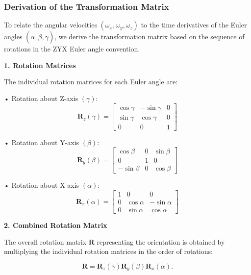 \documentclass[12pt]{article}
\begin{document}
\subsubsection{Derivation of the Transformation Matrix}

To relate the angular velocities \((\omega_x, \omega_y, \omega_z)\) to the time derivatives of the Euler angles \((\dot{\alpha}, \dot{\beta}, \dot{\gamma})\), we derive the transformation matrix based on the sequence of rotations in the ZYX Euler angle convention.

\vspace{0.5cm}

\textbf{1. Rotation Matrices}

The individual rotation matrices for each Euler angle are:

• Rotation about Z-axis \((\gamma)\):
\begin{equation}
\label{eq:R_z}
\mathbf{R}_z(\gamma) =
\begin{bmatrix}
\cos\gamma & -\sin\gamma & 0 \\
\sin\gamma & \cos\gamma & 0 \\
0 & 0 & 1
\end{bmatrix}
\end{equation}

• Rotation about Y-axis \((\beta)\):
\begin{equation}
\label{eq:R_y}
\mathbf{R}_y(\beta) =
\begin{bmatrix}
\cos\beta & 0 & \sin\beta \\
0 & 1 & 0 \\
-\sin\beta & 0 & \cos\beta
\end{bmatrix}
\end{equation}

• Rotation about X-axis \((\alpha)\):
\begin{equation}
\label{eq:R_x}
\mathbf{R}_x(\alpha) =
\begin{bmatrix}
1 & 0 & 0 \\
0 & \cos\alpha & -\sin\alpha \\
0 & \sin\alpha & \cos\alpha
\end{bmatrix}
\end{equation}

\textbf{2. Combined Rotation Matrix}

The overall rotation matrix $\mathbf{R}$ representing the orientation is obtained by multiplying the individual rotation matrices in the order of rotations:

\begin{equation}
\label{eq:R_total}
\mathbf{R} = \mathbf{R}_z(\gamma) \mathbf{R}_y(\beta) \mathbf{R}_x(\alpha) .
\end{equation}
\end{document}
